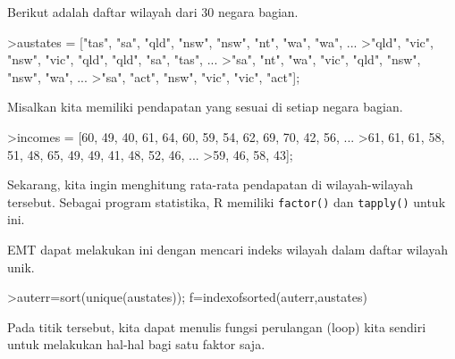 \documentclass[a4paper,11pt,oneside,enabledeprecatedfontcommands]{scrbook}
\newenvironment{eulernotebook}{}{}
\newenvironment{eulercomment}{\par\medskip\noindent}{\par\medskip}
\begin{document}
\begin{eulernotebook}
\begin{eulercomment}
			Berikut adalah daftar wilayah dari 30 negara bagian.
		\end{eulercomment}
		\begin{eulerprompt}
			>austates = ["tas", "sa", "qld", "nsw", "nsw", "nt", "wa", "wa", ...
			>"qld", "vic", "nsw", "vic", "qld", "qld", "sa", "tas", ...
			>"sa", "nt", "wa", "vic", "qld", "nsw", "nsw", "wa", ...
			>"sa", "act", "nsw", "vic", "vic", "act"];
		\end{eulerprompt}
		\begin{eulercomment}
			Misalkan kita memiliki pendapatan yang sesuai di setiap negara bagian.
		\end{eulercomment}
		\begin{eulerprompt}
			>incomes = [60, 49, 40, 61, 64, 60, 59, 54, 62, 69, 70, 42, 56, ...
			>61, 61, 61, 58, 51, 48, 65, 49, 49, 41, 48, 52, 46, ...
			>59, 46, 58, 43];
		\end{eulerprompt}
		\begin{eulercomment}
			Sekarang, kita ingin menghitung rata-rata pendapatan di wilayah-wilayah tersebut. Sebagai program
			statistika, R memiliki \texttt{factor()} dan \texttt{tapply()} untuk ini.
			
			EMT dapat melakukan ini dengan mencari indeks wilayah dalam daftar wilayah unik.
		\end{eulercomment}
		\begin{eulerprompt}
			>auterr=sort(unique(austates)); f=indexofsorted(auterr,austates)
		\end{eulerprompt}
		\begin{euleroutput}
			[6,  5,  4,  2,  2,  3,  8,  8,  4,  7,  2,  7,  4,  4,  5,  6,  5,  3,  8,  7,  4,  2,  2,  8,  5,
			1,  2,  7,  7,  1]
		\end{euleroutput}
		\begin{eulercomment}
			Pada titik tersebut, kita dapat menulis fungsi perulangan (loop) kita sendiri untuk melakukan hal-hal
			bagi satu faktor saja.
			

\end{eulercomment}
\end{eulernotebook}
\end{document}

